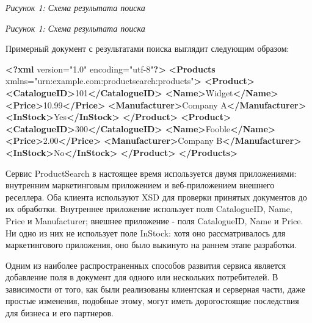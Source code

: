 \documentclass[11pt]{article}
\newenvironment{Shaded}{}{}
\newcommand{\KeywordTok}[1]{\textcolor[rgb]{0.00,0.44,0.13}{\textbf{{#1}}}}
\newcommand{\StringTok}[1]{\textcolor[rgb]{0.25,0.44,0.63}{{#1}}}
\newcommand{\OtherTok}[1]{\textcolor[rgb]{0.00,0.44,0.13}{{#1}}}
\newcommand{\NormalTok}[1]{{#1}}
\begin{document}
\emph{Рисунок 1: Схема результата поиска}

\emph{Рисунок 1: Схема результата поиска}

Примерный документ с результатами поиска выглядит следующим образом:

\begin{Shaded}
\begin{Highlighting}[]
\KeywordTok{<?xml}\NormalTok{ version="1.0" encoding="utf-8"}\KeywordTok{?>}
\KeywordTok{<Products}\OtherTok{ xmlns=}\StringTok{"urn:example.com:productsearch:products"}\KeywordTok{>}
  \KeywordTok{<Product>}
    \KeywordTok{<CatalogueID>}\NormalTok{101}\KeywordTok{</CatalogueID>}
    \KeywordTok{<Name>}\NormalTok{Widget}\KeywordTok{</Name>}
    \KeywordTok{<Price>}\NormalTok{10.99}\KeywordTok{</Price>}
    \KeywordTok{<Manufacturer>}\NormalTok{Company A}\KeywordTok{</Manufacturer>}
    \KeywordTok{<InStock>}\NormalTok{Yes}\KeywordTok{</InStock>}
  \KeywordTok{</Product>}
  \KeywordTok{<Product>}
    \KeywordTok{<CatalogueID>}\NormalTok{300}\KeywordTok{</CatalogueID>}
    \KeywordTok{<Name>}\NormalTok{Fooble}\KeywordTok{</Name>}
    \KeywordTok{<Price>}\NormalTok{2.00}\KeywordTok{</Price>}
    \KeywordTok{<Manufacturer>}\NormalTok{Company B}\KeywordTok{</Manufacturer>}
    \KeywordTok{<InStock>}\NormalTok{No}\KeywordTok{</InStock>}
  \KeywordTok{</Product>}
\KeywordTok{</Products>}
\end{Highlighting}
\end{Shaded}

Сервис ProductSearch в настоящее время используется двумя приложениями:
внутренним маркетинговым приложением и веб-приложением внешнего
реселлера. Оба клиента используют XSD для проверки принятых документов
до их обработки. Внутреннее приложение использует поля CatalogueID,
Name, Price и Manufacturer; внешнее приложение - поля CatalogueID, Name
и Price. Ни одно из них не использует поле InStock: хотя оно
рассматривалось для маркетингового приложения, оно было выкинуто на
раннем этапе разработки.

Одним из наиболее распространенных способов развития сервиса является
добавление поля в документ для одного или нескольких потребителей. В
зависимости от того, как были реализованы клиентская и серверная части,
даже простые изменения, подобные этому, могут иметь дорогостоящие
последствия для бизнеса и его партнеров.
\end{document}
